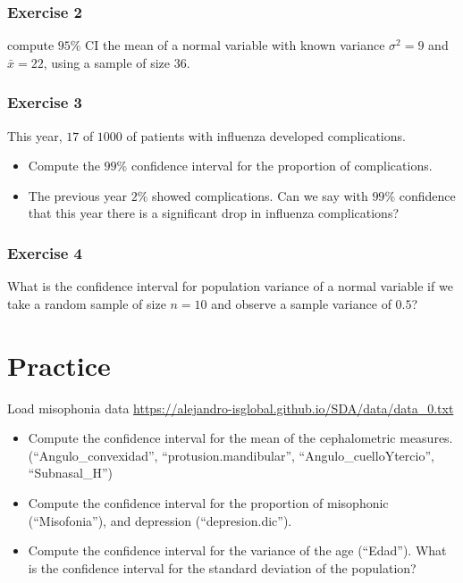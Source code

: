 \documentclass[
]{book}
\begin{document}
\hypertarget{exercise-2-10}{%
\subsubsection{Exercise 2}\label{exercise-2-10}}

compute \(95\%\) CI the mean of a normal variable with known variance \(\sigma^2=9\) and \(\bar{x}=22\), using a sample of size \(36\).

\hypertarget{exercise-3-7}{%
\subsubsection{Exercise 3}\label{exercise-3-7}}

This year, \(17\) of \(1000\) of patients with influenza developed complications.

\begin{itemize}
\item
  Compute the \(99\%\) confidence interval for the proportion of complications.
\item
  The previous year \(2\%\) showed complications. Can we say with \(99\%\) confidence that this year there is a significant drop in influenza complications?
\end{itemize}

\hypertarget{exercise-4-4}{%
\subsubsection{Exercise 4}\label{exercise-4-4}}

What is the confidence interval for population variance of a normal variable if we take a random sample of size \(n=10\) and observe a sample variance of \(0.5\)?

\hypertarget{practice-3}{%
\section{Practice}\label{practice-3}}

Load misophonia data \url{https://alejandro-isglobal.github.io/SDA/data/data_0.txt}

\begin{itemize}
\item
  Compute the confidence interval for the mean of the cephalometric measures. (``Angulo\_convexidad'', ``protusion.mandibular'', ``Angulo\_cuelloYtercio'', ``Subnasal\_H'')
\item
  Compute the confidence interval for the proportion of misophonic (``Misofonia''), and depression (``depresion.dic'').
\item
  Compute the confidence interval for the variance of the age (``Edad''). What is the confidence interval for the standard deviation of the population?
\end{itemize}
\end{document}

